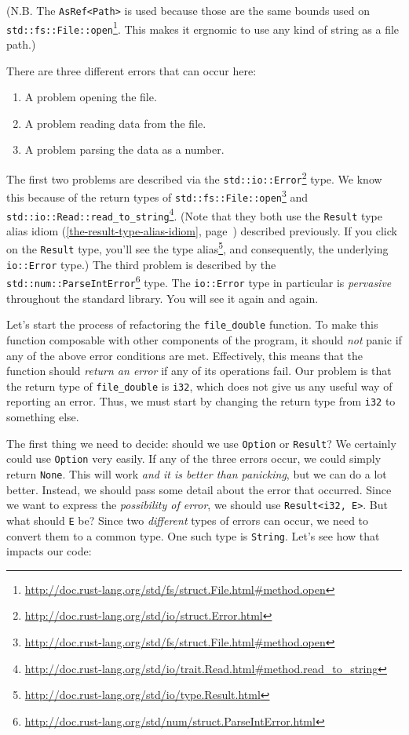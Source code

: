 \documentclass[a4paper,]{book}
\renewcommand*{\hyperref}[2][\ar]{%
  \def\ar{#2}%
  #2 (\autoref{#1}, page~\pageref{#1})}
\renewcommand{\href}[2]{#2\footnote{\url{#1}}}
\providecommand{\tightlist}{%
  \setlength{\itemsep}{0pt}\setlength{\parskip}{0pt}}
\begin{document}
(N.B. The \texttt{AsRef\textless{}Path\textgreater{}} is used because
those are the
\href{http://doc.rust-lang.org/std/fs/struct.File.html\#method.open}{same
bounds used on \texttt{std::fs::File::open}}. This makes it ergnomic to
use any kind of string as a file path.)

There are three different errors that can occur here:

\begin{enumerate}
\def\labelenumi{\arabic{enumi}.}
\tightlist
\item
  A problem opening the file.
\item
  A problem reading data from the file.
\item
  A problem parsing the data as a number.
\end{enumerate}

The first two problems are described via the
\href{http://doc.rust-lang.org/std/io/struct.Error.html}{\texttt{std::io::Error}}
type. We know this because of the return types of
\href{http://doc.rust-lang.org/std/fs/struct.File.html\#method.open}{\texttt{std::fs::File::open}}
and
\href{http://doc.rust-lang.org/std/io/trait.Read.html\#method.read_to_string}{\texttt{std::io::Read::read\_to\_string}}.
(Note that they both use the
\hyperref[the-result-type-alias-idiom]{\texttt{Result} type alias idiom}
described previously. If you click on the \texttt{Result} type, you'll
\href{http://doc.rust-lang.org/std/io/type.Result.html}{see the type
alias}, and consequently, the underlying \texttt{io::Error} type.) The
third problem is described by the
\href{http://doc.rust-lang.org/std/num/struct.ParseIntError.html}{\texttt{std::num::ParseIntError}}
type. The \texttt{io::Error} type in particular is \emph{pervasive}
throughout the standard library. You will see it again and again.

Let's start the process of refactoring the \texttt{file\_double}
function. To make this function composable with other components of the
program, it should \emph{not} panic if any of the above error conditions
are met. Effectively, this means that the function should \emph{return
an error} if any of its operations fail. Our problem is that the return
type of \texttt{file\_double} is \texttt{i32}, which does not give us
any useful way of reporting an error. Thus, we must start by changing
the return type from \texttt{i32} to something else.

The first thing we need to decide: should we use \texttt{Option} or
\texttt{Result}? We certainly could use \texttt{Option} very easily. If
any of the three errors occur, we could simply return \texttt{None}.
This will work \emph{and it is better than panicking}, but we can do a
lot better. Instead, we should pass some detail about the error that
occurred. Since we want to express the \emph{possibility of error}, we
should use \texttt{Result\textless{}i32,\ E\textgreater{}}. But what
should \texttt{E} be? Since two \emph{different} types of errors can
occur, we need to convert them to a common type. One such type is
\texttt{String}. Let's see how that impacts our code:
\end{document}
